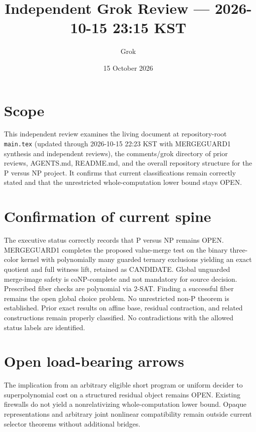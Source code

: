 \documentclass[11pt]{article}
\title{Independent Grok Review --- 2026-10-15 23:15 KST}
\author{Grok}
\date{15 October 2026}
\begin{document}
\maketitle

\begin{center}
\end{center}

\section{Scope}
This independent review examines the living document at repository-root \texttt{main.tex} (updated through 2026-10-15 22:23 KST with MERGEGUARD1 synthesis and independent reviews), the comments/grok directory of prior reviews, AGENTS.md, README.md, and the overall repository structure for the P versus NP project. It confirms that current classifications remain correctly stated and that the unrestricted whole-computation lower bound stays OPEN.

\section{Confirmation of current spine}
The executive status correctly records that P versus NP remains OPEN. MERGEGUARD1 completes the proposed value-merge test on the binary three-color kernel with polynomially many guarded ternary exclusions yielding an exact quotient and full witness lift, retained as CANDIDATE. Global unguarded merge-image safety is coNP-complete and not mandatory for source decision. Prescribed fiber checks are polynomial via 2-SAT. Finding a successful fiber remains the open global choice problem. No unrestricted non-P theorem is established. Prior exact results on affine base, residual contraction, and related constructions remain properly classified. No contradictions with the allowed status labels are identified.

\section{Open load-bearing arrows}
The implication from an arbitrary eligible short program or uniform decider to superpolynomial cost on a structured residual object remains OPEN. Existing firewalls do not yield a nonrelativizing whole-computation lower bound. Opaque representations and arbitrary joint nonlinear compatibility remain outside current selector theorems without additional bridges.
\end{document}
